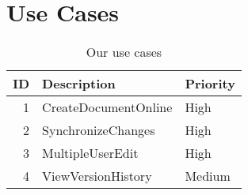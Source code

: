 \section{Use Cases}
\begin{table*}[ht]\centering
  \begin{tabularx}{\textwidth}{@{}rXl@{}}\toprule
    \textbf{ID} & \textbf{Description} & \textbf{Priority} \\\hline
    1
    & CreateDocumentOnline
    & High \\\hline
    2 
    & SynchronizeChanges
    & High \\\hline
    3 
    & MultipleUserEdit
    & High \\\hline
    4 
    & ViewVersionHistory
    & Medium \\
    \bottomrule
  \end{tabularx}
  \caption{Our use cases}
  \label{usecases}\centering%
\end{table*}


